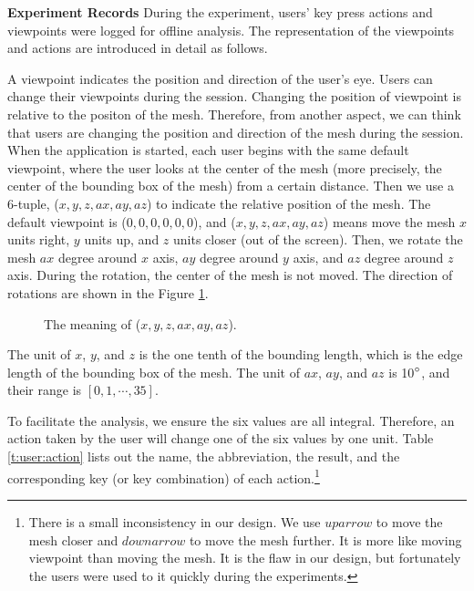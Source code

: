 \textbf{Experiment Records}
During the experiment, users' key press actions and viewpoints
were logged for offline analysis. The representation of the viewpoints
and actions are introduced in detail as follows.

A viewpoint indicates the position and direction of the user's eye.
Users can change their viewpoints during the session. Changing the position of 
viewpoint is relative to the positon of the mesh. Therefore, from another aspect, we can
think that users are changing the position and direction of the mesh during the session.
When the application is started, each user begins with the same default viewpoint,
where the user looks at the center of the mesh (more precisely,  the center of the bounding box of the mesh)
from a certain distance. 
Then we use a 6-tuple, ($x, y, z, ax, ay, az$) to indicate the relative position of the mesh. 
The default viewpoint is ($0, 0, 0, 0, 0, 0$), and ($x, y, z, ax, ay, az$) means
move the mesh $x$ units right, $y$ units up, and $z$ units closer (out of the screen). 
Then, we rotate the mesh $ax$ degree around $x$ axis, $ay$ degree around $y$ axis,
and $az$ degree around $z$ axis. During the rotation, the center of the mesh is not moved.
The direction of rotations are shown in the Figure \ref{f:user:viewpoint}.
\begin{figure}
    \centering
    \caption{The meaning of ($x, y, z, ax, ay, az$).}
    \label{f:user:viewpoint}
\end{figure}
The unit of $x$, 
$y$, and $z$ is the one tenth of the bounding length, which is the edge length
of the bounding box of the mesh. The unit of $ax$, $ay$, and $az$ is 10$^\circ$,
and their range is $[0, 1, \cdots, 35]$.

To facilitate the analysis, we ensure the six values are all integral. 
Therefore, an action taken by the user will change one of the six values by one unit.
Table \ref{t:user:action} lists out the name, the abbreviation, the result,
and the corresponding key (or key combination) of each action.\footnote{
There is a small inconsistency in our design. 
We use $uparrow$ to move the mesh closer and $downarrow$ to move the mesh
further. It is more like moving viewpoint than moving the mesh. 
It is the flaw in our design, but fortunately the users were used to it quickly
during the experiments.}

